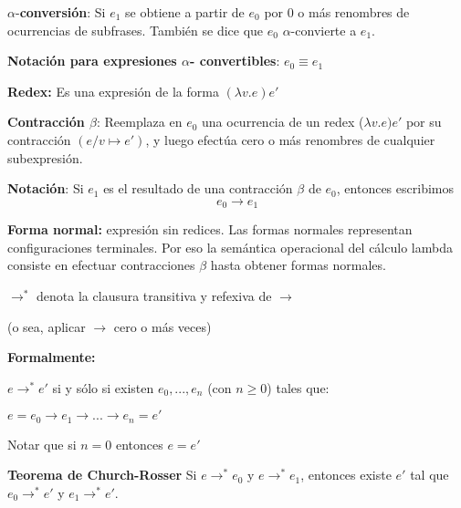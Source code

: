 \begin{section}
$\alpha$-\textbf{conversión}: Si $e_1$ se obtiene a partir de $e_0$ por 0
o más renombres de ocurrencias de subfrases. También se dice que $e_0$
$\alpha$-convierte a $e_1$.

\smallskip

\textbf{Notación para expresiones $\alpha$- convertibles}: $e_0\equiv e_1$

\smallskip

\textbf{Redex:} Es una expresión de la forma $(\lambda v.e) e'$

\smallskip

\textbf{Contracción $\beta$}: Reemplaza en $e_0$ una
ocurrencia de un redex ($\lambda v.e) e'$ por su contracción
$(e/v\mapsto e')$, y luego efectúa cero o más renombres de cualquier
subexpresión.

\clearpage

\textbf{Notación}: Si $e_1$ es el resultado de una contracción $\beta$ de $e_0$, entonces escribimos
\[e_0\rightarrow e_1\]

\smallskip

\textbf{Forma normal:} expresión sin redices.
Las formas normales representan configuraciones terminales.
Por eso la semántica operacional del cálculo lambda consiste
en efectuar contracciones $\beta$ hasta obtener formas normales.

\bigskip
\bigskip

$\rightarrow^*$ denota la clausura transitiva y refexiva de $\rightarrow$

(o sea, aplicar $\rightarrow$ cero o más veces)

\smallskip

\textbf{Formalmente:}

$e\rightarrow^* e'$ si y sólo si existen $e_0,...,e_{n}$ (con $n\geq 0$) tales que:

\quad$e=e_0\rightarrow e_1\rightarrow ... \rightarrow e_{n}= e'$

Notar que si $n = 0$ entonces $e=e'$

\clearpage
\smallskip

\textbf{Teorema de Church-Rosser} Si  $e\rightarrow^* e_0$  y $e\rightarrow^* e_1$,
entonces existe $e'$ tal que $e_0\rightarrow^* e'$ y $e_1\rightarrow^*  e'$.



\end{section}
